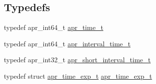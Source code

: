 \subsection*{Typedefs}
\begin{DoxyCompactItemize}
\item 
typedef apr\+\_\+int64\+\_\+t \hyperlink{group__apr__time_gadb4bde16055748190eae190c55aa02bb}{apr\+\_\+time\+\_\+t}
\item 
typedef apr\+\_\+int64\+\_\+t \hyperlink{group__apr__time_gaae2129185a395cc393f76fabf4f43e47}{apr\+\_\+interval\+\_\+time\+\_\+t}
\item 
typedef apr\+\_\+int32\+\_\+t \hyperlink{group__apr__time_ga3e4663cc0d8b730902ff697c8d3f64be}{apr\+\_\+short\+\_\+interval\+\_\+time\+\_\+t}
\item 
typedef struct \hyperlink{structapr__time__exp__t}{apr\+\_\+time\+\_\+exp\+\_\+t} \hyperlink{group__apr__time_gae28f2767111a534f263ced95a28489b1}{apr\+\_\+time\+\_\+exp\+\_\+t}
\end{DoxyCompactItemize}
